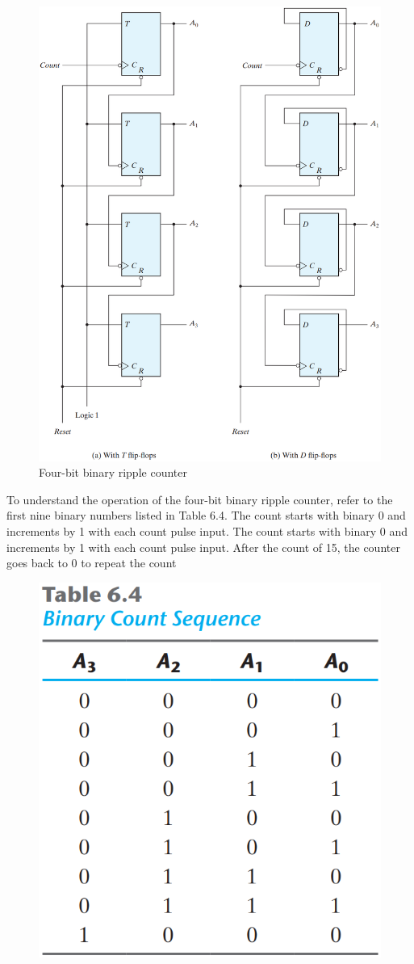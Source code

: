 \begin{figure}[H]
  \centering
  \includegraphics[width=\linewidth]{img/fig-6.8.png}
  \caption{Four-bit binary ripple counter}
  \label{fig:6.8}
\end{figure}

\noindent To understand the operation of the four-bit binary ripple counter, refer to the first nine binary numbers listed in Table 6.4. The count starts with binary 0 and increments by 1 with each count pulse input. The count starts with binary 0 and increments by 1 with each count pulse input. After the count of 15, the counter goes back to 0 to repeat the count

\begin{figure}[H]
  \centering
  \includegraphics[width=.5\linewidth]{img/table-6.4.png}
  \label{table:6.4}
\end{figure}

